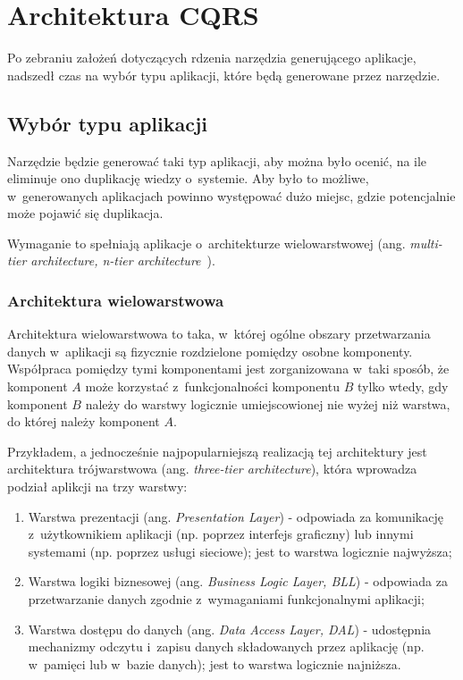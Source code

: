 \chapter{Architektura CQRS} \label{chap:generated_app_type}

Po zebraniu założeń dotyczących rdzenia narzędzia generującego aplikacje, nadszedł czas na wybór typu aplikacji, które będą generowane przez narzędzie.



\section{Wybór typu aplikacji}

Narzędzie będzie generować taki typ aplikacji, aby można było ocenić, na ile eliminuje ono duplikację wiedzy o~systemie.
Aby było to możliwe, w~generowanych aplikacjach powinno występować dużo miejsc, gdzie potencjalnie może pojawić się duplikacja.

Wymaganie to spełniają aplikacje o~architekturze wielowarstwowej (ang. \emph{multi-tier architecture, n-tier architecture}~\cite{ntier}).


\subsection{Architektura wielowarstwowa} \label{sec:multitier}

Architektura wielowarstwowa to taka, w~której ogólne obszary przetwarzania danych w~aplikacji są fizycznie rozdzielone pomiędzy osobne komponenty.
Współpraca pomiędzy tymi komponentami jest zorganizowana w~taki sposób, że komponent $A$ może korzystać z~funkcjonalności komponentu $B$ tylko wtedy, gdy komponent $B$ należy do warstwy logicznie umiejscowionej nie wyżej niż warstwa, do której należy komponent $A$.

Przykładem, a jednocześnie najpopularniejszą realizacją tej architektury jest architektura trójwarstwowa (ang. \emph{three-tier architecture}), która wprowadza podział aplikcji na trzy warstwy:

\begin{enumerate}
 \item Warstwa prezentacji (ang. \emph{Presentation Layer}) - odpowiada za komunikację z~użytkownikiem aplikacji (np. poprzez interfejs graficzny) lub innymi systemami (np. poprzez usługi sieciowe); jest to warstwa logicznie najwyższa;
 \item Warstwa logiki biznesowej (ang. \emph{Business Logic Layer, BLL}) - odpowiada za przetwarzanie danych zgodnie z~wymaganiami funkcjonalnymi aplikacji;
 \item Warstwa dostępu do danych (ang. \emph{Data Access Layer, DAL}) - udostępnia mechanizmy odczytu i~zapisu danych składowanych przez aplikację (np. w~pamięci lub w~bazie danych); jest to warstwa logicznie najniższa.
\end{enumerate}


